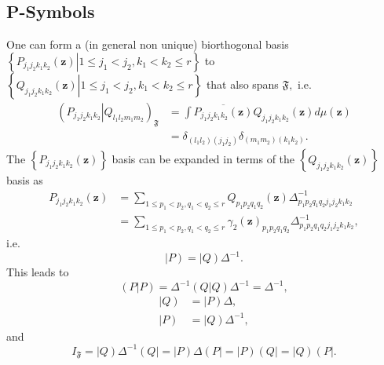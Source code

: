 \documentclass[aps,preprint]{revtex4}%
\begin{document}
\subsection{P-Symbols}

One can form a (in general non unique) biorthogonal basis $\left\{  \left.
P_{j_{1}j_{2}k_{1}k_{2}}\left(  \mathbf{z}\right)  \right\vert 1\leq
j_{1}<j_{2},k_{1}<k_{2}\leq r\right\}  $ to $\left\{  \left.  Q_{j_{1}%
j_{2}k_{1}k_{2}}\left(  \mathbf{z}\right)  \right\vert 1\leq j_{1}<j_{2}%
,k_{1}<k_{2}\leq r\right\}  $ that also spans $\mathfrak{F},$ i.e.
\begin{align}
\left(  P_{j_{1}j_{2}k_{1}k_{2}}\left\vert Q_{l_{1}l_{2}m_{1}m_{2}}\right.
\right)  _{\mathfrak{F}}  &  =\int\overline{P_{j_{1}j_{2}k_{1}k_{2}}\left(
\mathbf{z}\right)  }Q_{j_{1}j_{2}k_{1}k_{2}}\left(  \mathbf{z}\right)
d\mu\left(  \mathbf{z}\right) \nonumber\\
&  =\delta_{\left(  l_{1}l_{2}\right)  \left(  j_{1}j_{2}\right)  }%
\delta_{\left(  m_{1}m_{2}\right)  \left(  k_{1}k_{2}\right)  }.
\end{align}
The $\left\{  P_{j_{1}j_{2}k_{1}k_{2}}\left(  \mathbf{z}\right)  \right\}  $
basis can be expanded in terms of the $\left\{  Q_{j_{1}j_{2}k_{1}k_{2}%
}\left(  \mathbf{z}\right)  \right\}  $ basis as
\begin{align}
P_{j_{1}j_{2}k_{1}k_{2}}\left(  \mathbf{z}\right)   &  =\sum_{1\leq
p_{1}<p_{2},q_{1}<q_{2}\leq r}Q_{p_{1}p_{2}q_{1}q_{2}}\left(  \mathbf{z}%
\right)  \Delta_{p_{1}p_{2}q_{1}q_{2}j_{1}j_{2}k_{1}k_{2}}^{-1}\nonumber\\
&  =\sum_{1\leq p_{1}<p_{2},q_{1}<q_{2}\leq r}\gamma_{2}\left(  \mathbf{z}%
\right)  _{p_{1}p_{2}q_{1}q_{2}}\Delta_{p_{1}p_{2}q_{1}q_{2}j_{1}j_{2}%
k_{1}k_{2}}^{-1},
\end{align}
i.e.
\begin{equation}
\left\vert P\right)  =\left\vert Q\right)  \Delta^{-1}.
\end{equation}
This leads to
\begin{equation}
\left(  \left.  P\right\vert P\right)  =\Delta^{-1}\left(  \left.
Q\right\vert Q\right)  \Delta^{-1}=\Delta^{-1},
\end{equation}%
\begin{align}
\left\vert Q\right)   &  =\left\vert P\right)  \Delta,\nonumber\\
\left\vert P\right)   &  =\left\vert Q\right)  \Delta^{-1},
\end{align}
and%
\begin{equation}
I_{\mathfrak{F}}=\left\vert Q\right)  \Delta^{-1}\left(  Q\right\vert
=\left\vert P\right)  \Delta\left(  P\right\vert =\left\vert P\right)  \left(
Q\right\vert =\left\vert Q\right)  \left(  P\right\vert .
\end{equation}
\end{document}
